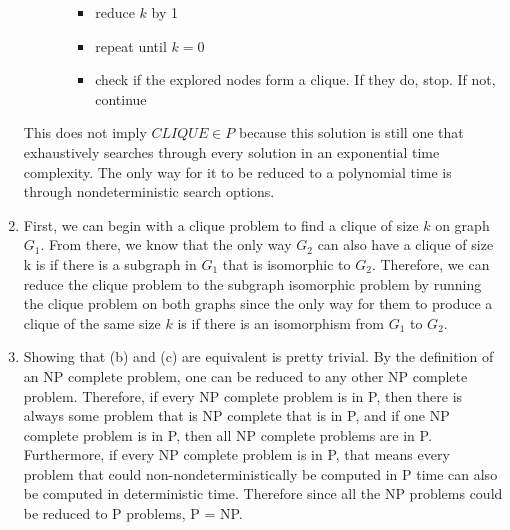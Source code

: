 \begin{enumerate}
\begin{itemize}
\begin{itemize}
\begin{itemize}
                \item reduce $k$ by 1

                \item repeat until $k = 0$

                \item check if the explored nodes form a clique. If they do, stop. If not, continue
            \end{itemize}
        \end{itemize}
    \end{itemize}

    This does not imply $CLIQUE \in P$ because this solution is still one that exhaustively searches through every solution in an exponential time complexity. The only way for it to be reduced to a polynomial time is through nondeterministic search options.

    \item First, we can begin with a clique problem to find a clique of size $k$ on graph $G_1$. From there, we know that the only way $G_2$ can also have a clique of size k is if there is a subgraph in $G_1$ that is isomorphic to $G_2$. Therefore, we can reduce the clique problem to the subgraph isomorphic problem by running the clique problem on both graphs since the only way for them to produce a clique of the same size $k$ is if there is an isomorphism from $G_1$ to $G_2$.

    \item Showing that (b) and (c) are equivalent is pretty trivial. By the definition of an NP complete problem, one can be reduced to any other NP complete problem. Therefore, if every NP complete problem is in P, then there is always some problem that is NP complete that is in P, and if one NP complete problem is in P, then all NP complete problems are in P. Furthermore, if every NP complete problem is in P, that means every problem that could non-nondeterministically be computed in P time can also be computed in deterministic time. Therefore since all the NP problems could be reduced to P problems, P = NP.
\end{enumerate}

